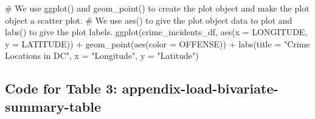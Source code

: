 \documentclass[
]{article}
\newenvironment{Shaded}{}{}
\newcommand{\AttributeTok}[1]{#1}
\newcommand{\CommentTok}[1]{\textcolor[rgb]{0.00,0.50,0.00}{#1}}
\newcommand{\FunctionTok}[1]{#1}
\newcommand{\NormalTok}[1]{#1}
\newcommand{\SpecialCharTok}[1]{\textcolor[rgb]{0.00,0.50,0.50}{#1}}
\newcommand{\StringTok}[1]{\textcolor[rgb]{0.00,0.50,0.50}{#1}}
\begin{document}
\begin{Shaded}
\begin{Highlighting}[]
\CommentTok{\# We use ggplot() and geom\_point() to create the plot object and make the plot object a scatter plot.}
\CommentTok{\# We use aes() to give the plot object data to plot and labs() to give the plot labels.}
\FunctionTok{ggplot}\NormalTok{(crime\_incidents\_df, }\FunctionTok{aes}\NormalTok{(}\AttributeTok{x =}\NormalTok{ LONGITUDE, }\AttributeTok{y =}\NormalTok{ LATITUDE)) }\SpecialCharTok{+} \FunctionTok{geom\_point}\NormalTok{(}\FunctionTok{aes}\NormalTok{(}\AttributeTok{color =}\NormalTok{ OFFENSE)) }\SpecialCharTok{+}
  \FunctionTok{labs}\NormalTok{(}\AttributeTok{title =} \StringTok{"Crime Locations in DC"}\NormalTok{, }
       \AttributeTok{x =} \StringTok{"Longitude"}\NormalTok{,}
       \AttributeTok{y =} \StringTok{"Latitude"}\NormalTok{)}
\end{Highlighting}
\end{Shaded}

\subsection{Code for Table 3:
appendix-load-bivariate-summary-table}\label{code-for-table-3-appendix-load-bivariate-summary-table}
\end{document}
